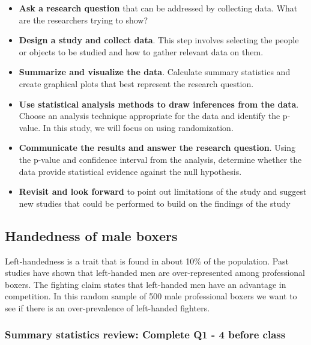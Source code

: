 \documentclass[
]{report}
\begin{document}
\begin{itemize}
\item
  \textbf{Ask a research question} that can be addressed by collecting data. What are the researchers trying to show?
\item
  \textbf{Design a study and collect data}. This step involves selecting the people or objects to be studied and how to gather relevant data on them.
\item
  \textbf{Summarize and visualize the data}. Calculate summary statistics and create graphical plots that best represent the research question.
\item
  \textbf{Use statistical analysis methods to draw inferences from the data}. Choose an analysis technique appropriate for the data and identify the p-value. In this study, we will focus on using randomization.
\item
  \textbf{Communicate the results and answer the research question}. Using the p-value and confidence interval from the analysis, determine whether the data provide statistical evidence against the null hypothesis.
\item
  \textbf{Revisit and look forward} to point out limitations of the study and suggest new studies that could be performed to build on the findings of the study
\end{itemize}

\newpage

\hypertarget{handedness-of-male-boxers}{%
\subsection{Handedness of male boxers}\label{handedness-of-male-boxers}}

Left-handedness is a trait that is found in about 10\% of the population. Past studies have shown that left-handed men are over-represented among professional boxers. The fighting claim states that left-handed men have an advantage in competition. In this random sample of 500 male professional boxers we want to see if there is an over-prevalence of left-handed fighters.

\hypertarget{summary-statistics-review-complete-q1---4-before-class}{%
\subsubsection*{Summary statistics review: Complete Q1 - 4 before class}\label{summary-statistics-review-complete-q1---4-before-class}}
\end{document}
